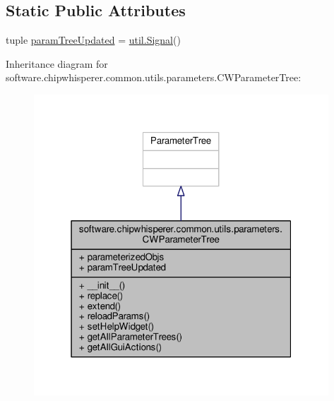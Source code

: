 \subsection*{Static Public Attributes}
\begin{DoxyCompactItemize}
\item 
tuple \hyperlink{classsoftware_1_1chipwhisperer_1_1common_1_1utils_1_1parameters_1_1CWParameterTree_a6a2bd5aafdc0cfe0755ff5abeb7edb71}{param\+Tree\+Updated} = \hyperlink{classsoftware_1_1chipwhisperer_1_1common_1_1utils_1_1util_1_1Signal}{util.\+Signal}()
\end{DoxyCompactItemize}


Inheritance diagram for software.\+chipwhisperer.\+common.\+utils.\+parameters.\+C\+W\+Parameter\+Tree\+:\nopagebreak
\begin{figure}[H]
\begin{center}
\leavevmode
\includegraphics[width=313pt]{d7/d0a/classsoftware_1_1chipwhisperer_1_1common_1_1utils_1_1parameters_1_1CWParameterTree__inherit__graph}
\end{center}
\end{figure}


